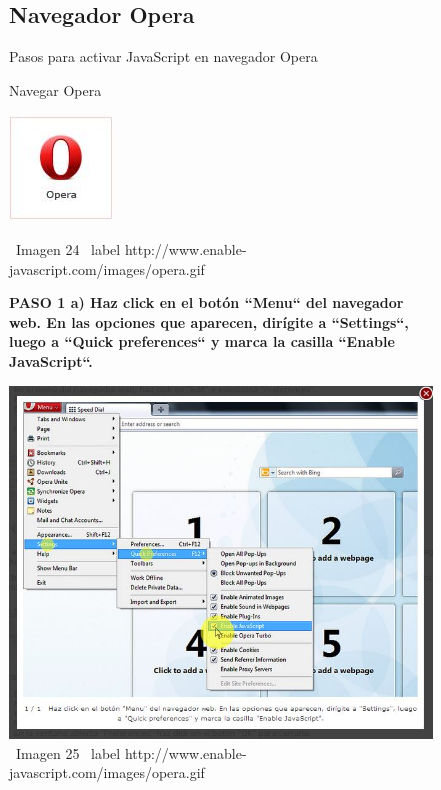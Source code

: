 \documentclass[11pt]{article} %
\begin{document}
\begin{figure}
\subsection{Navegador Opera}
Pasos para activar JavaScript en navegador Opera
\begin{center}
\begin{center}
Navegar Opera

\end{center}
\begin{center}
\includegraphics[height=3 cm, width=3 cm] {imagenes/opera.JPG}
\end{center}

\ Imagen 24
\ label {http://www.enable-javascript.com/images/opera.gif}
\newline

\begin{center}
\bf PASO 1
a) Haz click en el botón ``Menu`` del navegador web. En las opciones que aparecen, dirígite a ``Settings``, luego a ``Quick preferences`` y marca la casilla ``Enable JavaScript``.
\end{center}
\includegraphics[height=8 cm, width=8 cm] {imagenes/opera 01.JPG}
\newline
\newline
\ Imagen 25
\ label {http://www.enable-javascript.com/images/opera.gif}

\end{center}
\end{figure}
\end{document}
